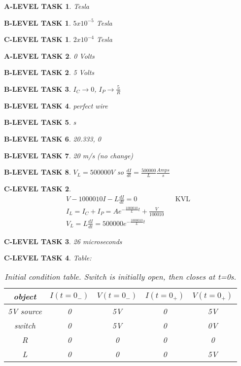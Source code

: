 \documentclass{book}
\numberwithin{equation}{section}
\newtheorem{alevel}{A-LEVEL TASK}
\newtheorem{blevel}{B-LEVEL TASK}
\newtheorem{clevel}{C-LEVEL TASK}
\theoremstyle{definition}
\begin{document}
\begin{alevel}Tesla\end{alevel}
\begin{blevel}$5x10^{-5}$ Tesla\end{blevel}
\begin{clevel}$2x10^{-4}$ Tesla\end{clevel}
\begin{alevel}0 Volts\end{alevel}
\begin{blevel}5 Volts\end{blevel}
\begin{blevel}$I_C \rightarrow 0$, $I_P \rightarrow \frac{5}{R}$ \end{blevel}
\begin{blevel}perfect wire\end{blevel}
\begin{blevel}s\end{blevel}

\begin{blevel}20.333, 0\end{blevel}
\begin{blevel}20 m/s (no change)\end{blevel}
\begin{blevel}$V_L=500000V$ so $\frac{dI}{dt}=\frac{500000}{L} \frac{Amps}{s}$\end{blevel}
\begin{clevel}
\begin{align*}
V-1000010I-L\frac{dI}{dt}=0&&\text{KVL}\\
I_L=I_C+I_P=Ae^{-\frac{1000010}{L}t}+\frac{V}{100010}\\
V_L=L\frac{dI}{dt}=500000e^{-\frac{1000010}{L}t}
\end{align*}
\end{clevel}
\begin{clevel}26 microseconds\end{clevel}

\begin{clevel}Table:\par
\begin{table}[H]
\begin{center}
\begin{tabular}{|c|c|c|c|c|} \hline
object	&$I(t=0_{-})$	&$V(t=0_{-})$	&$I(t=0_{+})$	&$V(t=0_{+})$ \\ \hline
5V source&0&5V&0&5V \\ \hline
switch&0&5V&0&0V \\ \hline
R&0&0&0&0 \\ \hline
L&0&0&0&5V \\ \hline
\end{tabular}
\caption{Initial condition table. Switch is initially open, then closes at t=0s.}
\label{T:6ICP}
\end{center}
\end{table}
\end{clevel}
\end{document}
